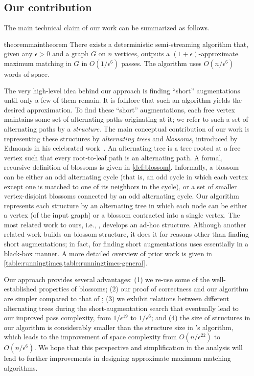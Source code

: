 \documentclass{article}
\newcommand{\eps}{\epsilon}
\begin{document}
\subsection{Our contribution}
\label{sec:contribution}
The main technical claim of our work can be summarized as follows.
\begin{restatable}{theorem}{maintheorem}
\label{thm:main}
There exists a deterministic semi-streaming algorithm that, given any $\eps > 0$ and a graph $G$ on $n$ vertices, outputs a $(1+\eps)$-approximate maximum matching in $G$ in $O(1/\eps^6)$ passes. The algorithm uses $O(n /\eps^6)$ words of space.
\end{restatable}
The very high-level idea behind our approach is finding ``short'' augmentations until only a few of them remain. It is folklore that such an algorithm yields the desired approximation.
To find these ``short'' augmentations, each free vertex maintains some set of alternating paths originating at it;
we refer to such a set of alternating paths by a \emph{structure}.
The main conceptual contribution of our work is representing these structures by \emph{alternating trees} and \emph{blossoms}, introduced by Edmonds in his celebrated work~\cite{edmonds1965paths}.
{An alternating tree is a tree rooted at a free vertex such that every root-to-leaf path is an alternating path.
A formal, recursive definition of blossoms is given in \cref{def:blossom}.
Informally, a blossom can be either an odd alternating cycle (that is, an odd cycle in which each vertex except one is matched to one of its neighbors in the cycle), or a set of smaller vertex-disjoint blossoms connected by an odd alternating cycle.
Our algorithm represents each structure by an alternating tree in which each node can be either a vertex (of the input graph) or a blossom contracted into a single vertex.}
The most related work to ours, i.e., \cite{FMU22}, develops an ad-hoc structure. Although another related work \cite{huang2023} builds on blossom structure, it does it for reasons other than finding short augmentations; in fact, for finding short augmentations \cite{huang2023} uses \cite{FMU22} essentially in a black-box manner.
A more detailed overview of prior work is given in \cref{table:runningtimes,table:runningtimes-general}.

Our approach provides several advantages:
(1) we re-use some of the well-established properties of blossoms;
(2) our proof of correctness and our algorithm are simpler compared to that of \cite{FMU22}; (3) we exhibit relations between different alternating trees during the short-augmentation search that eventually lead to our improved pass complexity, from $1 / \eps^{19}$ to $1 / \eps^{6}$;
and (4) the size of structures in our algorithm is considerably smaller than the structure size in \cite{FMU22}'s algorithm, which leads to the improvement of space complexity from $O(n/\eps^{22})$ to $O(n/\eps^{6})$.
We hope that this perspective and simplification in the analysis will lead to further improvements in designing approximate maximum matching algorithms.
\end{document}

